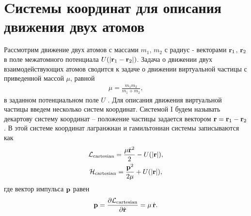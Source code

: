 \section{Cистемы координат для описания движения двух атомов}

Рассмотрим движение двух атомов с массами $m_1$, $m_2$ с радиус - векторами $\mathbf{r}_1$, $\mathbf{r}_2$ в поле межатомного потенциала $U(\vert \mathbf{r}_1 - \mathbf{r}_2 \vert)$. Задача о движении двух взаимодействующих атомов сводится к задаче о движении виртуальной частицы с приведенной массой $\mu$,  равной 
\begin{gather}
    \mu = \frac{m_1 m_2}{m_1 + m_2}, 
\end{gather}
%
в заданном потенциальном поле $U$ \cite{landau-volume1}. Для описания движения виртуальной частицы введем несколько систем координат. Системой I будем называть декартову систему координат -- положение частицы задается вектором $\mathbf{r} = \mathbf{r}_1 - \mathbf{r}_2$. В этой системе координат лагранжиан и гамильтониан системы записываются как 
\begin{gather}
    \mathcal{L}_\text{cartesian} = \frac{\mu \dot{\mathbf{r}}^2}{2} - U( \vert \mathbf{r} \vert ), \label{two-atom-cartesian-lagrangian} \\
    \mathcal{H}_\text{cartesian} = \frac{\mathbf{p}^2}{2\mu} + U( \vert \mathbf{r} \vert ), \label{two-atom-cartesian-hamiltonian}
\end{gather}
%
где вектор импульса $\mathbf{p}$ равен
\begin{gather}
    \mathbf{p} = \frac{\partial \mathcal{L}_\text{cartesian}}{\partial \dot{\mathbf{r}}} = \mu \, \dot{\mathbf{r}}. \label{two-atom-cartesian-momenta}
\end{gather}

